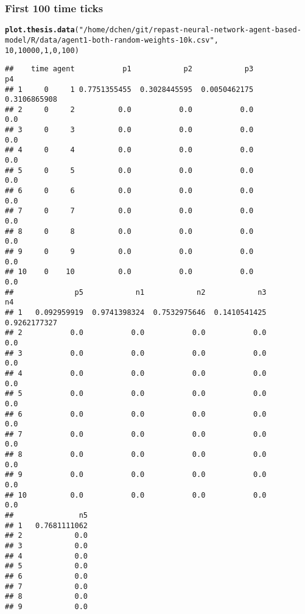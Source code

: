 \documentclass{article}\usepackage[]{graphicx}\usepackage[]{color}
\makeatletter
\newcommand{\hlnum}[1]{\textcolor[rgb]{0.686,0.059,0.569}{#1}}%
\newcommand{\hlstr}[1]{\textcolor[rgb]{0.192,0.494,0.8}{#1}}%
\newcommand{\hlstd}[1]{\textcolor[rgb]{0.345,0.345,0.345}{#1}}%
\newcommand{\hlkwd}[1]{\textcolor[rgb]{0.737,0.353,0.396}{\textbf{#1}}}%
\newenvironment{kframe}{%
 \def\at@end@of@kframe{}%
 \ifinner\ifhmode%
  \def\at@end@of@kframe{\end{minipage}}%
  \begin{minipage}{\columnwidth}%
 \fi\fi%
 \def\FrameCommand##1{\hskip\@totalleftmargin \hskip-\fboxsep
 \colorbox{shadecolor}{##1}\hskip-\fboxsep
     \hskip-\linewidth \hskip-\@totalleftmargin \hskip\columnwidth}%
 \MakeFramed {\advance\hsize-\width
   \@totalleftmargin\z@ \linewidth\hsize
   \@setminipage}}%
 {\par\unskip\endMakeFramed%
 \at@end@of@kframe}
\newenvironment{knitrout}{}{} %
\makeatother
\begin{document}
\subsubsection{First 100 time ticks}
\begin{knitrout}
\color{fgcolor}\begin{kframe}
\begin{alltt}
\hlkwd{plot.thesis.data}\hlstd{(}\hlstr{"/home/dchen/git/repast-neural-network-agent-based-model/R/data/agent1-both-random-weights-10k.csv"}\hlstd{,}
    \hlnum{10}\hlstd{,} \hlnum{10000}\hlstd{,} \hlnum{1}\hlstd{,} \hlnum{0}\hlstd{,} \hlnum{100}\hlstd{)}
\end{alltt}
\begin{verbatim}
##    time agent           p1            p2            p3            p4
## 1     0     1 0.7751355455  0.3028445595  0.0050462175  0.3106865908
## 2     0     2          0.0           0.0           0.0           0.0
## 3     0     3          0.0           0.0           0.0           0.0
## 4     0     4          0.0           0.0           0.0           0.0
## 5     0     5          0.0           0.0           0.0           0.0
## 6     0     6          0.0           0.0           0.0           0.0
## 7     0     7          0.0           0.0           0.0           0.0
## 8     0     8          0.0           0.0           0.0           0.0
## 9     0     9          0.0           0.0           0.0           0.0
## 10    0    10          0.0           0.0           0.0           0.0
##              p5            n1            n2            n3            n4
## 1   0.092959919  0.9741398324  0.7532975646  0.1410541425  0.9262177327
## 2           0.0           0.0           0.0           0.0           0.0
## 3           0.0           0.0           0.0           0.0           0.0
## 4           0.0           0.0           0.0           0.0           0.0
## 5           0.0           0.0           0.0           0.0           0.0
## 6           0.0           0.0           0.0           0.0           0.0
## 7           0.0           0.0           0.0           0.0           0.0
## 8           0.0           0.0           0.0           0.0           0.0
## 9           0.0           0.0           0.0           0.0           0.0
## 10          0.0           0.0           0.0           0.0           0.0
##               n5
## 1   0.7681111062
## 2            0.0
## 3            0.0
## 4            0.0
## 5            0.0
## 6            0.0
## 7            0.0
## 8            0.0
## 9            0.0

\end{verbatim}
\end{kframe}
\end{knitrout}
\end{document}
